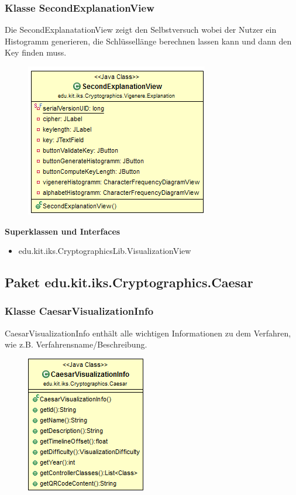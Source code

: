 \documentclass{article}
\begin{document}
    \subsubsection{Klasse SecondExplanationView}
      Die SecondExplanatationView zeigt den Selbstversuch wobei der Nutzer ein Histogramm generieren, die Schlüssellänge berechnen lassen kann und dann den Key finden muss.
      \begin{figure}[H]
        \centering
        \includegraphics{resources/edu-kit-iks-Cryptographics-Vigenere-SecondExplanationView}
      \end{figure}

      \textbf{Superklassen und Interfaces}
      \begin{itemize}
        \item edu.kit.iks.CryptographicsLib.VisualizationView
      \end{itemize}

\subsection{Paket edu.kit.iks.Cryptographics.Caesar}
  \subsubsection{Klasse CaesarVisualizationInfo}
      CaesarVisualizationInfo enthält alle wichtigen Informationen zu dem Verfahren, wie z.B. Verfahrensname/Beschreibung.
      \begin{figure}[H]
        \centering
        \includegraphics{resources/edu-kit-iks-Cryptographics-Caesar-CaesarVisualizationInfo}
      \end{figure}
\end{document}
